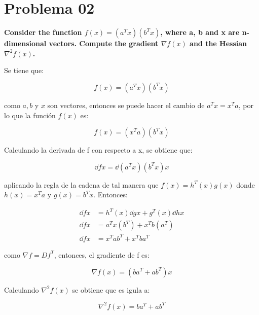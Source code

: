 \section*{Problema 02}

\textbf{Consider the function $f(x)=(a^Tx)(b^Tx)$, where a, b and x are n-dimensional vectors. Compute the gradient $\nabla f(x)$ and the Hessian $\nabla^2 f(x)$.}

Se tiene que:

\begin{equation*}
    f(x)  =  (a^Tx)(b^Tx)
\end{equation*}

como $a,b$ y $x$ son vectores, entonces se puede hacer el cambio de $a^T x = x^Ta$, por lo que la función $f(x)$ es:

\begin{equation*}
    f(x)  =  (x^Ta)(b^Tx)
\end{equation*}

Calculando la derivada de f con respecto a x, se obtiene que:

\begin{equation*}
    \dd{f}{x} = \dd{(a^Tx)(b^Tx)}{x}
\end{equation*}

aplicando la regla de la cadena de tal manera que $f(x)=h^T(x)g(x)$ donde $h(x)=x^Ta$ y $g(x)=b^Tx$. Entonces:

\begin{align*}
    \dd{f}{x} & = h^T(x)\dd{g}{x} + g^T(x) \dd{h}{x} \\[3pt]
    \dd{f}{x} & = a^Tx(b^T) + x^Tb(a^T)              \\[3pt]
    \dd{f}{x} & = x^Tab^T + x^Tba^T
\end{align*}

como $\nabla f = Df^T$, entonces, el gradiente de f es:

\begin{equation*}
    \nabla f(x) = (ba^T+ab^T)x
\end{equation*}

Calculando $\nabla^2 f(x)$ se obtiene que es igula a:

\begin{equation*}
    \nabla^2 f(x)= ba^T+ab^T
\end{equation*}